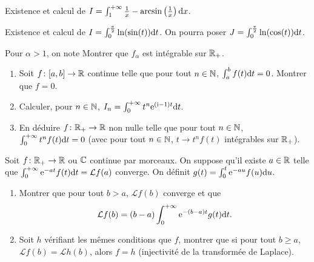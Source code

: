 \documentclass[12pt]{article}
\begin{document}
\begin{exercise}
    Existence et calcul de $I=\int_{1}^{+\infty}\frac{1}{x}-\arcsin\left(\frac{1}{x}\right)\mathrm{d} x$.
\end{exercise}

\begin{exercise}
    Existence et calcul de $I=\int_{0}^{\frac{\pi}{2}}\ln(\sin(t))\mathrm{d} t$. On pourra poser $J=\int_{0}^{\frac{\pi}{2}}\ln(\cos(t))\mathrm{d} t$.
\end{exercise}

\begin{exercise}
    Pour $\alpha>1$, on note 
    Montrer que $f_{\alpha}$ est intégrable sur $\mathbb{R}_{+}$. 
\end{exercise}

\begin{exercise}
    \phantom{}
    \begin{enumerate}
        \item Soit $f\colon[a,b]\to\mathbb{R}$ continue telle que pour tout $n\in\mathbb{N}$, $\int_{a}^{b}f(t)\mathrm{d} t=0$. Montrer que $f=0$.
        \item Calculer, pour $n\in\mathbb{N}$, $I_{n}=\int_{0}^{+\infty}t^{n}\mathrm{e}^{(\mathrm{i}-1)t}\mathrm{d} t$.
        \item En déduire $f\colon\mathbb{R}_{+}\to\mathbb{R}$ non nulle telle que pour tout $n\in\mathbb{N}$, $\int_{0}^{+\infty}t^{n}f(t)\mathrm{d} t=0$ (avec pour tout $n\in\mathbb{N}$, $t\to t^{n}f(t)$ intégrables sur $\mathbb{R}_{+}$). 
    \end{enumerate}
\end{exercise}

\begin{exercise}
    Soit $f\colon\mathbb{R}_{+}\to\mathbb{R}$ ou $\mathbb{C}$ continue par morceaux. On suppose qu'il existe $a\in\mathbb{R}$ telle que $\int_{0}^{+\infty}\mathrm{e}^{-at}f(t)\mathrm{d} t=\mathcal{L}f(a)$ converge. On définit $g(t)=\int_{0}^{t}\mathrm{e}^{-a u}f(u)\mathrm{d} u$.
    \begin{enumerate}
        \item Montrer que pour tout $b>a$, $\mathcal{L}f(b)$ converge et que 
        \begin{equation}
            \mathcal{L}f(b)=(b-a)\int_{0}^{+\infty}\mathrm{e}^{-(b-a)t}g(t)\mathrm{d} t.
        \end{equation}
        \item Soit $h$ vérifiant les mêmes conditions que $f$, montrer que si pour tout $b\geqslant a$, $\mathcal{L}f(b)=\mathcal{L}h(b)$, alors $f=h$ (injectivité de la transformée de Laplace).
    \end{enumerate}
\end{exercise}
\end{document}
